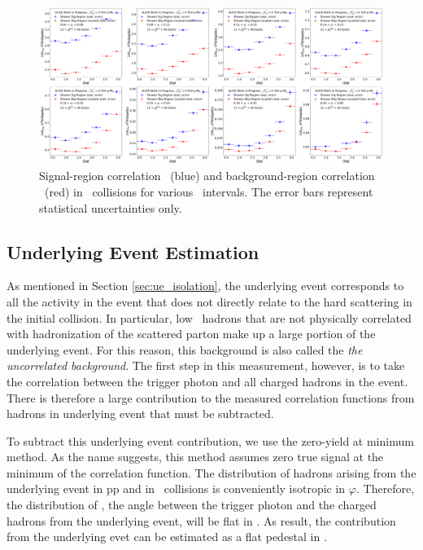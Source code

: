 \begin{figure}
    \centering
    \includegraphics[width = 1.0 \textwidth]{G-H_New/p-Pb_SR_BR_Overlay_pT_0.pdf}
    \caption{Signal-region correlation \CSR~(blue) and background-region correlation \CBR~(red) in \pPb~collisions for various \zt~intervals. The error bars represent statistical uncertainties only.}
    \label{fig:pPb_SR_BR_Overlay_pPb}
\end{figure}
\FloatBarrier


\subsection{Underlying Event Estimation}
\label{sec:ue_subtraction}
As mentioned in Section \ref{sec:ue_isolation}, the underlying event corresponds to all the activity in the event that does not directly relate to the hard scattering in the initial collision. In particular, low \pt~hadrons that are not physically correlated with hadronization of the scattered parton make up a large portion of the underlying event. For this reason, this background is also called the \textit{the uncorrelated background}. The first step in this measurement, however, is to take the correlation between the trigger photon and all charged hadrons in the event. There is therefore a large contribution to the measured correlation functions from hadrons in underlying event that must be subtracted.

To subtract this underlying event contribution, we use the zero-yield at minimum method. As the name suggests, this method assumes zero true signal at the minimum of the correlation function. The distribution of hadrons arising from the underlying event in pp and in \pPb~collisions is conveniently isotropic in $\varphi$. Therefore, the distribution of \deltaphi, the angle between the trigger photon and the charged hadrons from the underlying event, will be flat in \deltaphi. As result, the contribution from the underlying evet can be estimated as a flat pedestal in \deltaphi.

